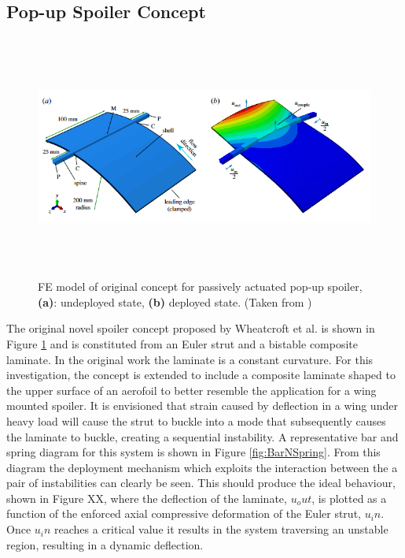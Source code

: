 \documentclass{IEEEtran}
\begin{document}
		\subsection{Pop-up Spoiler Concept}
		\begin{figure}[!h]
			\centering
			\includegraphics[height=8cm]{IntroductionImages/Concept.png}
			\caption{FE model of original concept for passively actuated pop-up spoiler, \textbf{(a)}: undeployed state, \textbf{(b)} deployed state. (Taken from \cite{Wheatcroft_2023})}
			\label{fig:OGConcept}
		\end{figure}
	
		The original novel spoiler concept proposed by Wheatcroft et al. is shown in Figure \ref{fig:OGConcept} and is constituted from an Euler strut and a bistable composite laminate. In the original work the laminate is a constant curvature. For this investigation, the concept is extended to include a composite laminate shaped to the upper surface of an aerofoil to better resemble the application for a wing mounted spoiler. It is envisioned that strain caused by deflection in a wing under heavy load will cause the strut to buckle into a mode that subsequently causes the laminate to buckle, creating a sequential instability. A representative bar and spring diagram for this system is shown in Figure \ref{fig:BarNSpring}. From this diagram the deployment mechanism which exploits the  interaction between the a pair of instabilities can clearly be seen. This should produce the ideal behaviour, shown in Figure XX, where the deflection of the laminate, $u_out$, is plotted as a function of the enforced axial compressive deformation of the Euler strut, $u_in$. Once $u_in$  reaches a critical value it results in the system traversing an unstable region, resulting in a dynamic deflection.
\end{document}
